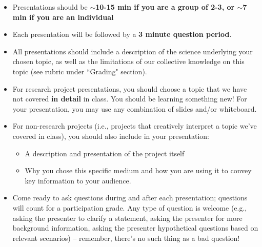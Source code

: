 \documentclass[12pt]{article}
\begin{document}
\begin{itemize}[noitemsep]
    \item Presentations should be \textbf{$\sim$10-15 min if you are a group of 2-3, or $\sim$7 min if you are an individual}
    \item Each presentation will be followed by a \textbf{3 minute question period}.
    \item All presentations should include a description of the science underlying your chosen topic, as well as the limitations of our collective knowledge on this topic (see rubric under ``Grading" section).
    \item For research project presentations, you should choose a topic that we have not covered \textbf{in detail} in class. You should be learning something new! For your presentation, you may use any combination of slides and/or whiteboard.
    \item For non-research projects (i.e., projects that creatively interpret a topic we've covered in class), you should also include in your presentation:
    \begin{itemize}
        \item A description and presentation of the project itself
        \item Why you chose this specific medium and how you are using it to convey key information to your audience.
    \end{itemize}
    \item Come ready to ask questions during and after each presentation; questions will count for a participation grade.  Any type of question is welcome (e.g., asking the presenter to clarify a statement, asking the presenter for more background information, asking the presenter hypothetical questions based on relevant scenarios) -- remember, there's no such thing as a bad question!
\end{itemize}
\end{document}
